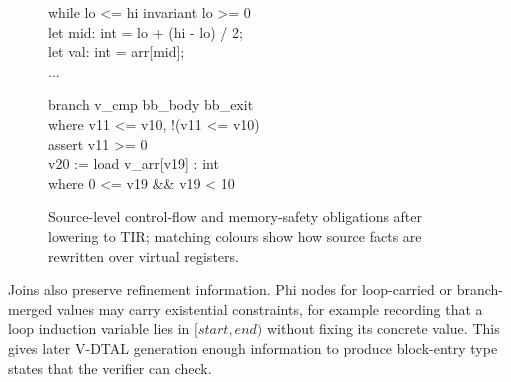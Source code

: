\begin{figure}[H]
  \newcommand{\flowkw}[1]{\textcolor{blue!70!black}{#1}}
  \newcommand{\flowlo}[1]{\textcolor{teal!70!black}{#1}}
  \newcommand{\flowhi}[1]{\textcolor{orange!85!black}{#1}}
  \newcommand{\flowmid}[1]{\textcolor{red!70!black}{#1}}
  \newcommand{\flowarr}[1]{\textcolor{violet!75!black}{#1}}
  \newcommand{\flowob}[1]{\textcolor{green!45!black}{#1}}
  \newcommand{\flowval}[1]{\textcolor{magenta!70!black}{#1}}
  \newcommand{\flowblk}[1]{\textcolor{gray!75!black}{#1}}
  \centering
  \begin{minipage}{0.47\textwidth}
    \footnotesize\ttfamily
    \flowkw{while} \flowlo{lo} \flowob{<=} \flowhi{hi} \flowkw{invariant} \flowlo{lo} \flowob{>= 0} \flowkw{\textbraceleft}\\
    \null\hspace*{1em}\flowkw{let} \flowmid{mid}: int = \flowlo{lo} + (\flowhi{hi} - \flowlo{lo}) / 2;\\
    \null\hspace*{1em}\flowkw{let} \flowval{val}: int = \flowarr{arr}[\flowmid{mid}];\\
    \null\hspace*{1em}\flowblk{...}\\
    \flowkw{\textbraceright}
  \end{minipage}
  \hspace{0.03\textwidth}
  \begin{minipage}{0.47\textwidth}
    \footnotesize\ttfamily
    \flowkw{branch} \flowob{v\_cmp} \flowblk{bb\_body} \flowblk{bb\_exit}\\
    \null\hspace*{1em}\flowkw{where} \flowlo{v11} \flowob{<=} \flowhi{v10}, !(\flowlo{v11} \flowob{<=} \flowhi{v10})\\
    \flowkw{assert} \flowlo{v11} \flowob{>= 0}\\
    \flowval{v20} := \flowkw{load} \flowarr{v\_arr}[\flowmid{v19}] : int\\
    \null\hspace*{1em}\flowkw{where} \flowob{0 <=} \flowmid{v19} \flowob{\&\&} \flowmid{v19} \flowob{< 10}
  \end{minipage}
  \captionsetup{aboveskip=4pt, belowskip=2pt}
  \caption{Source-level control-flow and memory-safety obligations after lowering to TIR; matching colours show how source facts are rewritten over virtual registers.}
  \label{fig:tast-to-tir-snippets}
\end{figure}

Joins also preserve refinement information. Phi nodes for loop-carried or branch-merged values may carry existential constraints, for example recording that a loop induction variable lies in $[\mathit{start},\mathit{end})$ without fixing its concrete value. This gives later V-DTAL generation enough information to produce block-entry type states that the verifier can check.

